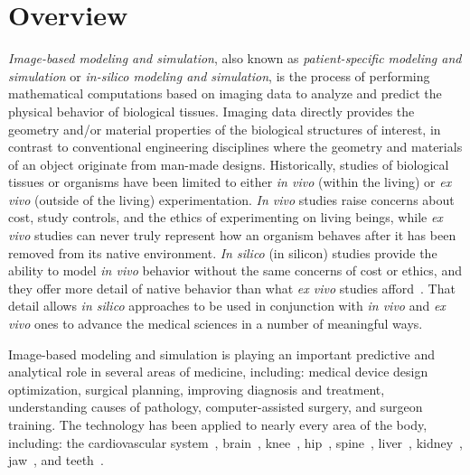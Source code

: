 \chapter{Overview}
\textit{Image-based modeling and simulation}, also known as \textit{patient-specific modeling and simulation} or \textit{in-silico modeling and simulation}, is the process of performing mathematical computations based on imaging data to analyze and predict the physical behavior of biological tissues. Imaging data directly provides the geometry and/or material properties of the biological structures of interest, in contrast to conventional engineering disciplines where the geometry and materials of an object originate from man-made designs. Historically, studies of biological tissues or organisms have been limited to either \textit{in vivo} (within the living) or \textit{ex vivo} (outside of the living) experimentation. \textit{In vivo} studies raise concerns about cost, study controls, and the ethics of experimenting on living beings, while \textit{ex vivo} studies can never truly represent how an organism behaves after it has been removed from its native environment. \textit{In silico} (in silicon) studies provide the ability to model \textit{in vivo} behavior without the same concerns of cost or ethics, and they offer more detail of native behavior than what \textit{ex vivo} studies afford~\cite{colquitt_2011}. That detail allows \textit{in silico} approaches to be used in conjunction with \textit{in vivo} and \textit{ex vivo} ones to advance the medical sciences in a number of meaningful ways.


Image-based modeling and simulation is playing an important predictive and analytical role in several areas of medicine, including:  medical device design optimization,  surgical planning, improving diagnosis and treatment, understanding causes of pathology, computer-assisted surgery, and surgeon training. The technology has been applied to nearly every area of the body, including: the cardiovascular system~\cite{min_2015, updegrove_2016}, brain~\cite{weickenmeier_2016, behnia_2008}, knee~\cite{erdemir_2015, donahue_2002}, hip~\cite{anderson_2008, el'sheikh_2003}, spine~\cite{malandrino_2014, dumas_2005}, liver~\cite{shi_2008, schwen_2014}, kidney~\cite{eloot_2002, snedeker_2005}, jaw~\cite{idrus_2017, narra_2014}, and teeth~\cite{frisardi_2011, geng_2001}. 

